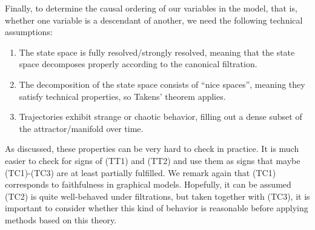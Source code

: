 \documentclass[11pt, a4paper]{memoir}
\theoremstyle{break}
\theoremstyle{break}
\theoremstyle{nonumberplain}
\begin{document}
Finally, to determine the causal ordering of our variables in the model, that is, whether one variable is a descendant of another, we need the following technical assumptions:
\begin{enumerate}[itemindent=15pt,label=(TC\arabic*)]
	\item The state space is fully resolved/strongly resolved, meaning that the state space decomposes properly according to the canonical filtration.
	\item The decomposition of the state space consists of \enquote{nice spaces}, meaning they satisfy technical properties, so Takens' theorem applies.
	\item Trajectories exhibit strange or chaotic behavior, filling out a dense subset of the attractor/manifold over time.
\end{enumerate}
As discussed, these properties can be very hard to check in practice. It is much easier to check for signs of (TT1) and (TT2) and use them as signs that maybe (TC1)-(TC3) are at least partially fulfilled. We remark again that (TC1) corresponds to faithfulness in graphical models. Hopefully, it can be assumed (TC2) is quite well-behaved under filtrations, but taken together with (TC3), it is important to consider whether this kind of behavior is reasonable before applying methods based on this theory.
\end{document}
